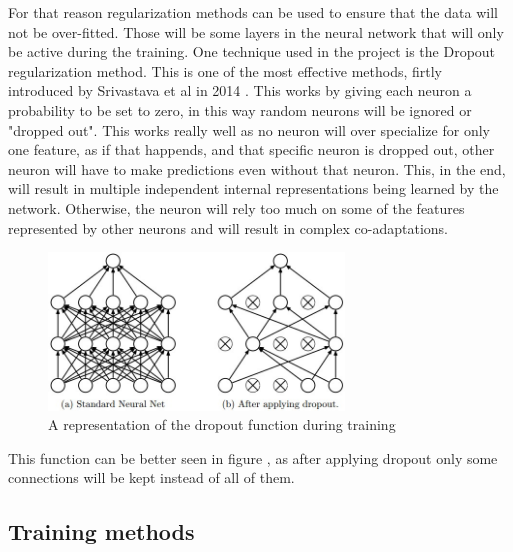 For that reason regularization methods can be used to ensure that the data will not be over-fitted. Those will be some layers in the neural network that will only be active during the training.
One technique used in the project is the Dropout regularization method. This is one of the most effective methods, firtly introduced by Srivastava et al in 2014 . This works by giving each neuron a probability to be set to zero, in this way random neurons will be ignored or "dropped out". This works really well as no neuron will over specialize for only one feature, as if that happends, and that specific neuron is dropped out, other neuron will have to make predictions even without that neuron. This, in the end, will result in multiple independent internal representations being learned by the network. Otherwise, the neuron will rely too much on some of the features represented by other neurons and will result in complex co-adaptations.

\begin{figure}[htp]
	\centering
	\includegraphics[width=0.7\textwidth]{Illustrations/dropout.jpeg}
	\caption{A representation of the dropout function during training}
	\label{fig:dropout}
\end{figure}

This function can be better seen in figure , as after applying dropout only some connections will be kept instead of all of them.

\subsection{Training methods}






